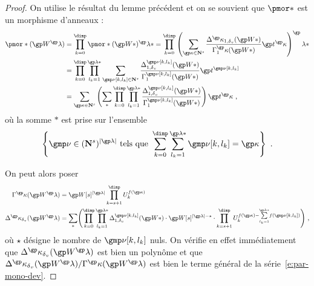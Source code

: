 \begin{proof}
  On utilise le résultat du lemme précédent et on se souvient que \( \pmor* \)
  est un morphisme d'anneaux :
  \newcommand \indl {{ \gmp\nu[\ind, \indi_\ind] }}
  \begin{align}
    \pmor*( \anyvp^\ip )
    & =
    \prod\indrange \pmor*( \anyvp* )^\ip*
    =
    \prod\indrange \left(
      \sum_{\derp \in \N^\anydim}
      \frac {
        \pmnum^\derp_{1, \dv}( \anyvp* )
      }{
        \pmden_1^\derp    ( \anyvp* )
      }
      \psp^\derp
    \right) ^\ip*
    \\ & =
    \prod\indrange
    \prod_{ \indi_\ind = 1 }^{ \ip* }
    \sum _{ \indl \in \N^\anydim }
    \frac {
      \pmnum^\indl_{1, \dv}( \anyvp* )
    }{
      \pmden_1^\indl    ( \anyvp* )
    }
    \psp^\indl
    \\ & = \label{e:par-mono-dev}
    \sum_{\derp \in \N^\anydim}
    \left(
      \sum_*
      \prod\indrange
      \prod_{ \indi_\ind = 1 }^{ \ip* }
      \frac {
        \pmnum^\indl_{1, \dv}( \anyvp* )
      }{
        \pmden_1^\indl    ( \anyvp* )
      }
    \right)
    \psp^\derp
    \pmm,
  \end{align}
  où la somme \( * \) est prise sur l'ensemble
  \begin{equation}
    \left\{
      \gmp\nu \in (\N^\anydim)^{\lgr\ip}
      \text{ tels que }
      \sum\indrange \sum_{\indi_\ind = 1}^{\ip*} \indl = \derp
    \right\}
    \pmm.
  \end{equation}

  On peut alors poser
  \begin{align}
    \pmden^\derp    ( \anyvp^\ip )
    & =
    \anyvp[\anydim]^{\lgr\ip}
    \prod_{\ind = \anydim + 1}^{\dimp} \pden_\ind^{f(\derp)}
    \\
    \pmnum^\derp_\dv( \anyvp^\ip )
    & =
    \sum_*
    \Biggl(
    \prod\indrange
    \prod_{ \indi_\ind = 1 }^{ \ip* }
    \pmnum^\indl_{1, \dv}( \anyvp* )
    \cdot
    \anyvp[\anydim]^{\lgr\ip - \star}
    \cdot
    \prod_{\ind = \anydim + 1}^{\dimp}
    \pden_\ind^{ f(\derp)
      - \smash{ \sum\limits_{\indi_\ind = 1}^{\ip*} } f(\indl) }
    \Biggr)
    \pmm,
  \end{align}
  où \( \star \) désigne le nombre de \( \indl \) nuls. On vérifie en effet
  immédiatement que \( \pmnum^\derp_\dv( \anyvp^\ip ) \) est bien un polynôme
  et que \( \pmnum^\derp_\dv( \anyvp^\ip ) / \pmden^\derp ( \anyvp^\ip ) \)
  est bien le terme général de la série~\ref{e:par-mono-dev}.


\end{proof}
